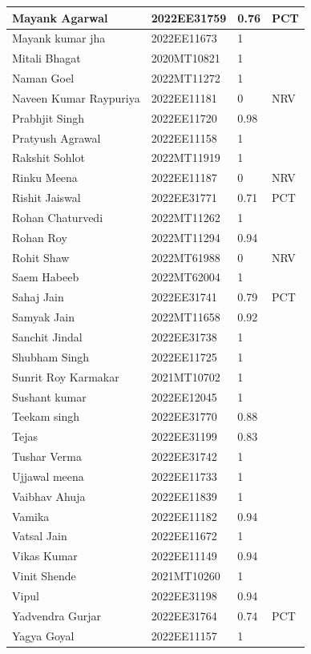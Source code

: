 \documentclass[12pt,a4paper]{article}
\begin{document}
\begin{longtable}{|l|l|l|l|}
        Mayank Agarwal & 2022EE31759 & 0.76 & PCT \\ \hline
        Mayank kumar jha & 2022EE11673 & 1 & ~ \\ \hline
        Mitali Bhagat & 2020MT10821 & 1 & ~ \\ \hline
        Naman Goel & 2022MT11272 & 1 & ~ \\ \hline
        Naveen Kumar Raypuriya & 2022EE11181 & 0 & NRV \\ \hline
        Prabhjit Singh & 2022EE11720 & 0.98 & ~ \\ \hline
        Pratyush Agrawal & 2022EE11158 & 1 & ~ \\ \hline
        Rakshit Sohlot & 2022MT11919 & 1 & ~ \\ \hline
        Rinku Meena & 2022EE11187 & 0 & NRV \\ \hline
        Rishit Jaiswal & 2022EE31771 & 0.71 & PCT \\ \hline
        Rohan Chaturvedi & 2022MT11262 & 1 & ~ \\ \hline
        Rohan Roy & 2022MT11294 & 0.94 & ~ \\ \hline
        Rohit Shaw & 2022MT61988 & 0 & NRV \\ \hline
        Saem Habeeb & 2022MT62004 & 1 & ~ \\ \hline
        Sahaj Jain & 2022EE31741 & 0.79 & PCT \\ \hline
        Samyak Jain & 2022MT11658 & 0.92 & ~ \\ \hline
        Sanchit Jindal & 2022EE31738 & 1 & ~ \\ \hline
        Shubham Singh & 2022EE11725 & 1 & ~ \\ \hline
        Sunrit Roy Karmakar & 2021MT10702 & 1 & ~ \\ \hline
        Sushant kumar & 2022EE12045 & 1 & ~ \\ \hline
        Teekam singh & 2022EE31770 & 0.88 & ~ \\ \hline
        Tejas & 2022EE31199 & 0.83 & ~ \\ \hline
        Tushar Verma & 2022EE31742 & 1 & ~ \\ \hline
        Ujjawal meena & 2022EE11733 & 1 & ~ \\ \hline
        Vaibhav Ahuja & 2022EE11839 & 1 & ~ \\ \hline
        Vamika & 2022EE11182 & 0.94 & ~ \\ \hline
        Vatsal Jain & 2022EE11672 & 1 & ~ \\ \hline
        Vikas Kumar & 2022EE11149 & 0.94 & ~ \\ \hline
        Vinit Shende & 2021MT10260 & 1 & ~ \\ \hline
        Vipul & 2022EE31198 & 0.94 & ~ \\ \hline
        Yadvendra Gurjar & 2022EE31764 & 0.74 & PCT \\ \hline
        Yagya Goyal & 2022EE11157 & 1 & ~ \\ \hline
\end{longtable}
\end{document}
